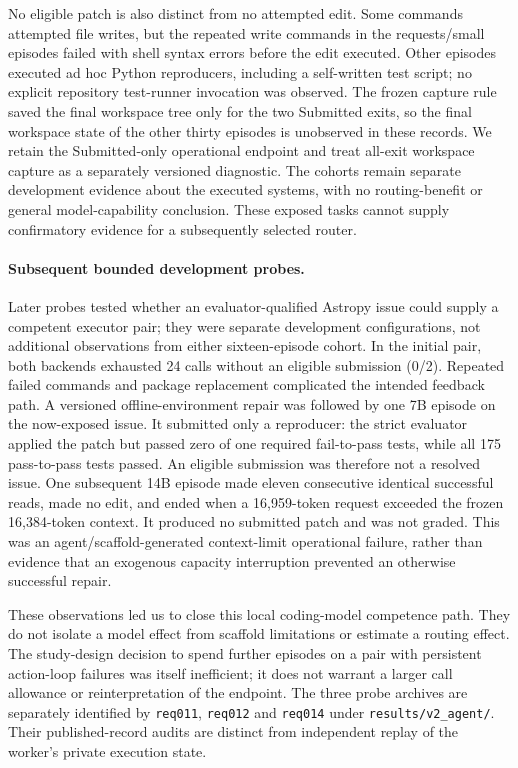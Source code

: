 No eligible patch is also distinct from no attempted edit. Some commands attempted file writes, but
the repeated write commands in the requests/small episodes failed with shell syntax errors before the
edit executed. Other episodes executed ad hoc Python reproducers, including a self-written test script;
no explicit repository test-runner invocation was observed. The frozen capture rule saved the final
workspace tree only for the two Submitted exits, so the final workspace state of the other thirty
episodes is unobserved in these records. We retain the Submitted-only operational endpoint and treat
all-exit workspace capture as a separately versioned diagnostic. The cohorts remain separate development
evidence about the executed systems, with no routing-benefit or general model-capability conclusion.
These exposed tasks cannot supply confirmatory evidence for a subsequently selected router.

\paragraph{Subsequent bounded development probes.}
Later probes tested whether an evaluator-qualified Astropy issue could supply a competent executor pair;
they were separate development configurations, not additional observations from either sixteen-episode
cohort. In the initial pair, both backends exhausted 24 calls without an eligible submission (0/2).
Repeated failed commands and package replacement complicated the intended feedback path. A versioned
offline-environment repair was followed by one 7B episode on the now-exposed issue. It submitted only a
reproducer: the strict evaluator applied the patch but passed zero of one required fail-to-pass tests,
while all 175 pass-to-pass tests passed. An eligible submission was therefore not a resolved issue.
One subsequent 14B episode made eleven consecutive identical successful reads, made no edit, and ended
when a 16,959-token request exceeded the frozen 16,384-token context. It produced no submitted patch
and was not graded. This was an agent/scaffold-generated context-limit operational failure, rather than
evidence that an exogenous capacity interruption prevented an otherwise successful repair.

These observations led us to close this local coding-model competence path. They do not isolate a model
effect from scaffold limitations or estimate a routing effect. The study-design decision to spend further
episodes on a pair with persistent action-loop failures was itself inefficient; it does not warrant a larger
call allowance or reinterpretation of the endpoint. The three probe archives are separately identified by
\texttt{req011}, \texttt{req012} and \texttt{req014} under \texttt{results/v2\_agent/}.
Their published-record audits are distinct from independent replay of the worker's private execution state.

